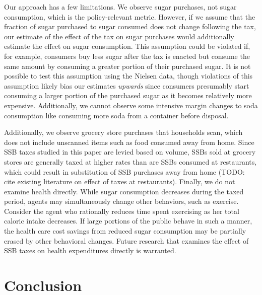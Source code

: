 \documentclass[12pt]{article}
\begin{document}
Our approach has a few limitations. We observe sugar purchases, not sugar consumption, which is the policy-relevant metric. However, if we assume that the fraction of sugar purchased to sugar consumed does not change following the tax, our estimate of the effect of the tax on sugar purchases would additionally estimate the effect on sugar consumption. This assumption could be violated if, for example, consumers buy less sugar after the tax is enacted but consume the same amount by consuming a greater portion of their purchased sugar. It is not possible to test this assumption using the Nielsen data, though violations of this assumption likely bias our estimates \textit{upwards} since consumers presumably start consuming a larger portion of the purchased sugar as it becomes relatively more expensive. Additionally, we cannot observe some intensive margin changes to soda consumption like consuming more soda from a container before disposal.

Additionally, we observe grocery store purchases that households scan, which does not include unscanned items such as food consumed away from home. Since SSB taxes studied in this paper are levied based on volume, SSBs sold at grocery stores are generally taxed at higher rates than are SSBs consumed at restaurants, which could result in substitution of SSB purchases away from home (TODO: cite existing literature on effect of taxes at restaurants). Finally, we do not examine health directly. While sugar consumption decreases during the taxed period, agents may simultaneously change other behaviors, such as exercise. Consider the agent who rationally reduces time spent exercising as her total caloric intake decreases. If large portions of the public behave in such a manner, the health care cost savings from reduced sugar consumption may be partially erased by other behavioral changes. Future research that examines the effect of SSB taxes on health expenditures directly is warranted.


\section{Conclusion} \label{conclusion}
\end{document}
